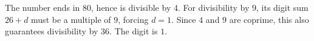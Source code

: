 The number ends in $80$, hence is divisible by $4$. For divisibility by $9$, its digit sum $26+d$ must be a multiple of $9$, forcing $d=1$. Since $4$ and $9$ are coprime, this also guarantees divisibility by $36$. The digit is $\boxed1$.
